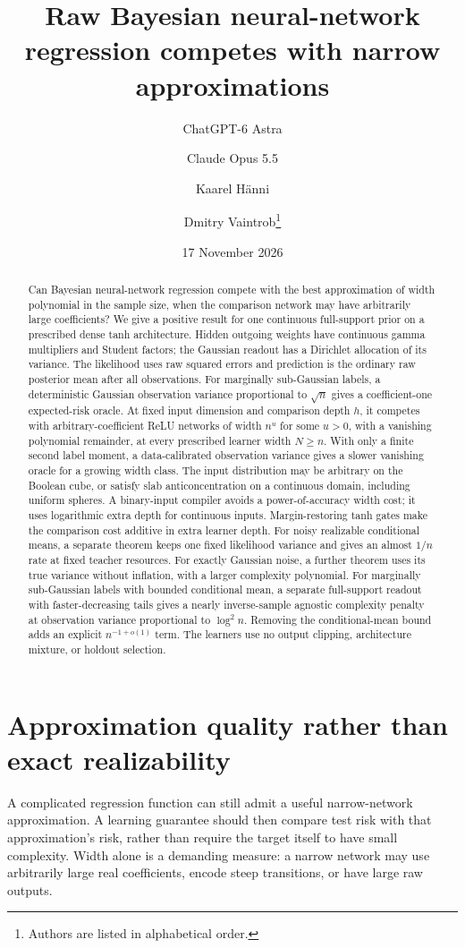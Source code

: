 \documentclass[11pt]{article}
\title{Raw Bayesian neural-network regression competes with narrow approximations}
\author{ChatGPT-6 Astra \and Claude Opus 5.5 \and Kaarel H\"anni \and Dmitry Vaintrob\thanks{Authors are listed in alphabetical order.}}
\date{17 November 2026}
\begin{document}
\maketitle
\begin{abstract}
Can Bayesian neural-network regression compete with the best approximation
of width polynomial in the sample size, when the comparison network may
have arbitrarily large coefficients?  We give a positive result for one
continuous full-support prior on a prescribed dense tanh architecture.
Hidden outgoing weights have continuous gamma multipliers and Student
factors; the Gaussian readout has a Dirichlet allocation of its variance.
The likelihood uses raw squared errors and prediction is the ordinary raw
posterior mean after all observations.  For marginally sub-Gaussian labels,
a deterministic Gaussian observation variance proportional to $\sqrt n$
gives a coefficient-one expected-risk oracle.  At fixed input dimension
and comparison depth $h$, it competes with arbitrary-coefficient ReLU
networks of width $n^u$ for some $u>0$, with a vanishing polynomial
remainder, at every prescribed learner width $N\ge n$.
With only a finite second label moment, a data-calibrated observation
variance gives a slower vanishing oracle for a growing width class.
The input distribution may be arbitrary on the Boolean cube, or satisfy
slab anticoncentration on a continuous domain, including uniform spheres.
A binary-input compiler avoids a power-of-accuracy width cost; it uses
logarithmic extra depth for continuous inputs.  Margin-restoring tanh gates
make the comparison cost additive in extra learner depth.  For noisy
realizable conditional means, a separate theorem keeps one fixed likelihood
variance and gives an almost $1/n$ rate at fixed teacher resources.
For exactly Gaussian noise, a further theorem uses its true variance
without inflation, with a larger complexity polynomial.  For marginally
sub-Gaussian labels with bounded conditional mean, a separate full-support
readout with faster-decreasing tails gives a nearly inverse-sample agnostic
complexity penalty at observation variance proportional to $\log^2 n$.
Removing the conditional-mean bound adds an explicit $n^{-1+o(1)}$ term.
The learners use no output clipping, architecture mixture, or holdout
selection.
\end{abstract}

\section{Approximation quality rather than exact realizability}
A complicated regression function can still admit a useful narrow-network
approximation.  A learning guarantee should then compare test risk with
that approximation's risk, rather than require the target itself to have
small complexity.  Width alone is a demanding measure: a narrow network
may use arbitrarily large real coefficients, encode steep transitions, or
have large raw outputs.
\end{document}
